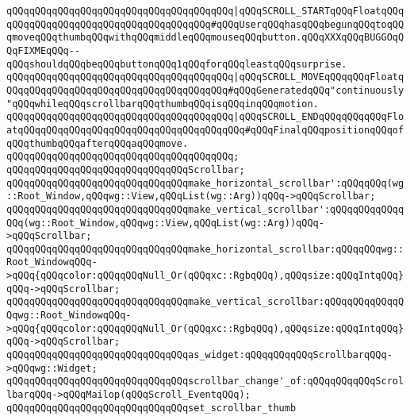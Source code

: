\verb|qQQqqQQqqQQqqQQqqQQqqQQqqQQqqQQqqQQqqQQq|\verb#|qQQqSCROLL_STARTqQQqFloatqQQqqQQqqQQqqQQqqQQqqQQqqQQqqQQqqQQqqQQq#\verb|#qQQqUserqQQqhasqQQqbegunqQQqtoqQQqmoveqQQqthumbqQQqwithqQQqmiddleqQQqmouseqQQqbutton.qQQqXXXqQQqBUGGOqQQqFIXMEqQQq--qQQqshouldqQQqbeqQQqbuttonqQQq1qQQqforqQQqleastqQQqsurprise.|\newline
\verb|qQQqqQQqqQQqqQQqqQQqqQQqqQQqqQQqqQQqqQQq|\verb#|qQQqSCROLL_MOVEqQQqqQQqFloatqQQqqQQqqQQqqQQqqQQqqQQqqQQqqQQqqQQqqQQq#\verb|#qQQqGeneratedqQQq"continuously"qQQqwhileqQQqscrollbarqQQqthumbqQQqisqQQqinqQQqmotion.|\newline
\verb|qQQqqQQqqQQqqQQqqQQqqQQqqQQqqQQqqQQqqQQq|\verb#|qQQqSCROLL_ENDqQQqqQQqqQQqFloatqQQqqQQqqQQqqQQqqQQqqQQqqQQqqQQqqQQqqQQq#\verb|#qQQqFinalqQQqpositionqQQqofqQQqthumbqQQqafterqQQqaqQQqmove.|\newline
\verb|qQQqqQQqqQQqqQQqqQQqqQQqqQQqqQQqqQQqqQQq;|\newline
\newline
\verb|qQQqqQQqqQQqqQQqqQQqqQQqqQQqqQQqScrollbar;|\newline
\newline
\verb|qQQqqQQqqQQqqQQqqQQqqQQqqQQqqQQqmake_horizontal_scrollbar':qQQqqQQq(wg::Root_Window,qQQqwg::View,qQQqList(wg::Arg))qQQq->qQQqScrollbar;|\newline
\verb|qQQqqQQqqQQqqQQqqQQqqQQqqQQqqQQqmake_vertical_scrollbar':qQQqqQQqqQQqqQQq(wg::Root_Window,qQQqwg::View,qQQqList(wg::Arg))qQQq->qQQqScrollbar;|\newline
\newline
\verb|qQQqqQQqqQQqqQQqqQQqqQQqqQQqqQQqmake_horizontal_scrollbar:qQQqqQQqwg::Root_WindowqQQq->qQQq{qQQqcolor:qQQqqQQqNull_Or(qQQqxc::RgbqQQq),qQQqsize:qQQqIntqQQq}qQQq->qQQqScrollbar;|\newline
\verb|qQQqqQQqqQQqqQQqqQQqqQQqqQQqqQQqmake_vertical_scrollbar:qQQqqQQqqQQqqQQqwg::Root_WindowqQQq->qQQq{qQQqcolor:qQQqqQQqNull_Or(qQQqxc::RgbqQQq),qQQqsize:qQQqIntqQQq}qQQq->qQQqScrollbar;|\newline
\newline
\verb|qQQqqQQqqQQqqQQqqQQqqQQqqQQqqQQqas_widget:qQQqqQQqqQQqScrollbarqQQq->qQQqwg::Widget;|\newline
\newline
\verb|qQQqqQQqqQQqqQQqqQQqqQQqqQQqqQQqscrollbar_change'_of:qQQqqQQqqQQqScrollbarqQQq->qQQqMailop(qQQqScroll_EventqQQq);|\newline
\newline
\verb|qQQqqQQqqQQqqQQqqQQqqQQqqQQqqQQqset_scrollbar_thumb|\newline
